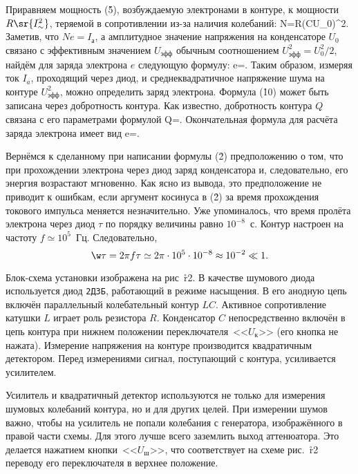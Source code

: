 Приравняем мощность (\r{5}), возбуждаемую электронами в контуре, к мощности $R\sr{I_{\sim}^2}$, теряемой в сопротивлении
из-за наличия колебаний:
N=R(CU_0\w)^2.
\ee
Заметив, что $Ne=I_а$, а амплитудное значение напряжения на конденсаторе $U_0$ связано с эффективным значением $U_{эфф}$
обычным соотношением $U^2_{эфф}=U_0^2/2$, найдём для заряда электрона $e$ следующую формулу:
e=.
\ee
Таким образом, измеряя ток $I_a$, проходящий через диод, и среднеквадратичное напряжение шума на контуре $U^2_{эфф}$,
можно определить заряд электрона. Формула (\r{10}) может быть записана через добротность контура. Как известно,
добротность контура $Q$ связана с его параметрами формулой
Q=.
\ee
Окончательная формула для расчёта заряда электрона имеет вид
e=.
\ee

Вернёмся к сделанному при написании формулы (\r{2}) предположению о том, что при прохождении электрона через диод заряд
конденсатора и, следовательно, его энергия возрастают мгновенно. Как ясно из вывода, это предположение не приводит к
ошибкам, если аргумент косинуса в (\r{2}) за время прохождения токового импульса меняется незначительно. Уже
упоминалось, что время пролёта электрона через диод $\tau$ по порядку величины равно $10^{-8}$~с. Контур настроен на
частоту $f\simeq10^5$~Гц. Следовательно,
\[
\w\tau=2\pi f\tau\simeq2\pi\cdot 10^5\cdot 10^{-8}\approx10^{-2}\ll1.
\]

\eo Блок-схема установки изображена на рис~\r{r2}. В качестве шумового диода используется диод {\tt 2Д3Б}, работающий в
режиме насыщения. В его анодную цепь включён параллельный колебательный контур $LC$. Активное сопротивление катушки $L$
играет роль резистора $R$. Конденсатор $C$ непосредственно включён в цепь контура при нижнем положении
переключателя~<<$U_к$>> (его кнопка не нажата). Измерение напряжения на контуре производится квадратичным детектором.
Перед измерениями сигнал, поступающий с контура, усиливается усилителем.

Усилитель и квадратичный детектор используются не только для измерения шумовых колебаний контура, но и для других целей.
При измерении шумов важно, чтобы на усилитель не попали колебания с генератора, изображённого в правой части схемы. Для
этого лучше всего заземлить выход аттенюатора. Это делается нажатием кнопки~<<$U_ш$>>, что соответствует на схеме
рис.~\r{r2} переводу его переключателя в верхнее положение.


